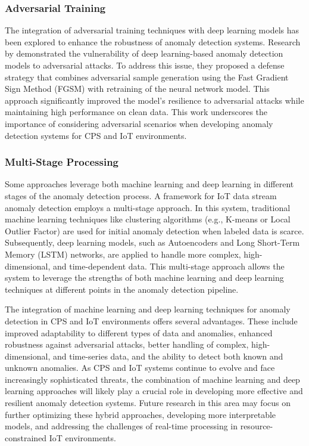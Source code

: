 \subsubsection{Adversarial Training}

The integration of adversarial training techniques with deep learning models has been explored to enhance the robustness of anomaly detection systems. Research by \cite{67} demonstrated the vulnerability of deep learning-based anomaly detection models to adversarial attacks. To address this issue, they proposed a defense strategy that combines adversarial sample generation using the Fast Gradient Sign Method (FGSM) with retraining of the neural network model. This approach significantly improved the model's resilience to adversarial attacks while maintaining high performance on clean data. This work underscores the importance of considering adversarial scenarios when developing anomaly detection systems for CPS and IoT environments.

\subsubsection{Multi-Stage Processing}

Some approaches leverage both machine learning and deep learning in different stages of the anomaly detection process. A framework for IoT data stream anomaly detection \cite{79} employs a multi-stage approach. In this system, traditional machine learning techniques like clustering algorithms (e.g., K-means or Local Outlier Factor) are used for initial anomaly detection when labeled data is scarce. Subsequently, deep learning models, such as Autoencoders and Long Short-Term Memory (LSTM) networks, are applied to handle more complex, high-dimensional, and time-dependent data. This multi-stage approach allows the system to leverage the strengths of both machine learning and deep learning techniques at different points in the anomaly detection pipeline.



The integration of machine learning and deep learning techniques for anomaly detection in CPS and IoT environments offers several advantages. These include improved adaptability to different types of data and anomalies, enhanced robustness against adversarial attacks, better handling of complex, high-dimensional, and time-series data, and the ability to detect both known and unknown anomalies. As CPS and IoT systems continue to evolve and face increasingly sophisticated threats, the combination of machine learning and deep learning approaches will likely play a crucial role in developing more effective and resilient anomaly detection systems. Future research in this area may focus on further optimizing these hybrid approaches, developing more interpretable models, and addressing the challenges of real-time processing in resource-constrained IoT environments.










